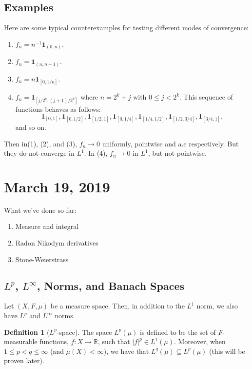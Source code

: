 \documentclass{article}
\theoremstyle{definition}
\newtheorem{definition}[theorem]{Definition}
\begin{document}
\subsection{Examples}

Here are some typical counterexamples for testing different modes of convergence:
\begin{enumerate}[(1)]
	\item $f_n=n^{-1}\mathbf{1}_{(0,n)}$.
	\item $f_n=\mathbf{1}_{(n,n+1)}$.
	\item $f_n=n\mathbf{1}_{[0,1/n]}$.
	\item $f_n=\mathbf{1}_{[j/2^k,(j+1)/2^k]}$ where $n=2^k+j$ with $0\leq j<2^k$.
		This sequence of functions behaves as follows:
		\begin{equation*}
			\mathbf{1}_{[0,1]},
			\mathbf{1}_{[0,1/2]},
			\mathbf{1}_{[1/2,1]},
			\mathbf{1}_{[0,1/4]},
			\mathbf{1}_{[1/4,1/2]},
			\mathbf{1}_{[1/2,3/4]},
			\mathbf{1}_{[3/4,1]},
		\end{equation*}
		and so on.
\end{enumerate}

Then in(1), (2), and (3), $f_n \rightarrow 0$ uniformly, pointwise and a.e respectively.
But they do not converge in $L^1$.
In (4), $f_n \rightarrow 0$ in $L^1$, but not pointwise.

\section{March 19, 2019}

What we've done so far:
\begin{enumerate}
    \item Measure and integral
    \item Radon Nikodym derivatives
    \item Stone-Weierstrass
\end{enumerate}

\subsection{\( L^p \), \( L^\infty \), Norms, and Banach Spaces}

Let \((X,F,\mu)\) be a measure space. Then, in addition to the \(L^1\) norm, we also have \(L^p\) and \(L^\infty \)
norms.

\begin{definition}[\(L^p\)-space]
    The space \(L^p(\mu)\) is defined to be the set of \(F\)-measurable functions, \(f:X\rightarrow\mathbb{R} \), such that
    \(|f|^p\in L^1(\mu)\). Moreover, when \(1\leq p<q\leq\infty \) (and \(\mu(X)<\infty \)), we have that
    \(L^q(\mu)\subseteq L^p(\mu)\) (this will be proven later).
\end{definition}
\end{document}
